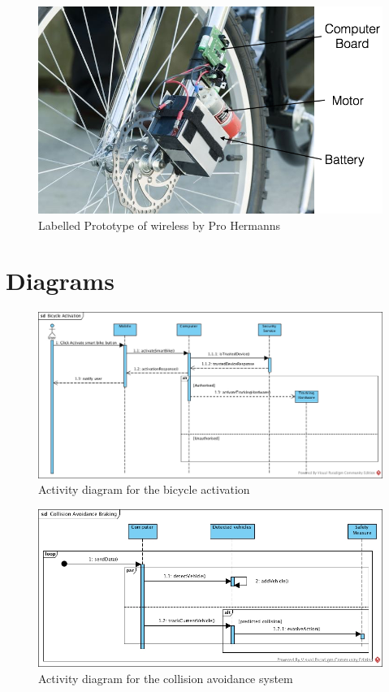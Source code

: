 \documentclass[a4paper]{report}
\begin{document}
{\begin{figure}[h]
\centering
\includegraphics[scale=0.5]{figures/electronic_braking/wireless_bicycle_brakes_labelled}
\caption{Labelled Prototype of wireless by Pro Hermanns \citep{wireless_bicycle_brakes}}
\label{fig:wireless_bicycle_brakes}
\end{figure}
\chapter{Diagrams}
\begin{figure}[h]
\centering
\includegraphics[scale=0.5, angle=90]{figures/bicycle_activation}
\caption{Activity diagram for the bicycle activation}
\end{figure}
\begin{figure}[h]
\centering
\includegraphics[scale=0.7, angle=90]{figures/collision_avoidance}
\caption{Activity diagram for the collision avoidance system}
\end{figure}


}
\end{document}
